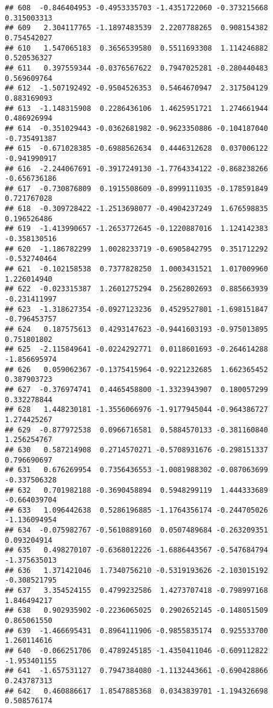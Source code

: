 \documentclass[
]{article}
\begin{document}
\begin{verbatim}
## 608  -0.846404953 -0.4953335703 -1.4351722060 -0.373215668  0.315003313
## 609   2.304117765 -1.1897483539  2.2207788265  0.908154382  0.754542027
## 610   1.547065183  0.3656539580  0.5511693308  1.114246882  0.520536327
## 611   0.397559344 -0.0376567622  0.7947025281 -0.280440483  0.569609764
## 612  -1.507192492 -0.9504526353  0.5464670947  2.317504129  0.883169093
## 613  -1.148315908  0.2286436106  1.4625951721  1.274661944  0.486926994
## 614  -0.351029443 -0.0362681982 -0.9623350886 -0.104187040 -0.735491387
## 615  -0.671028385 -0.6988562634  0.4446312628  0.037006122 -0.941990917
## 616  -2.244067691 -0.3917249130 -1.7764334122 -0.868238266 -0.656736186
## 617  -0.730876809  0.1915508609 -0.8999111035 -0.178591849  0.721767028
## 618  -0.309728422 -1.2513698077 -0.4904237249  1.676598835  0.196526486
## 619  -1.413990657 -1.2653772645 -0.1220887016  1.124142383 -0.358130516
## 620  -1.186782299  1.0028233719 -0.6905842795  0.351712292 -0.532740464
## 621  -0.102158538  0.7377828250  1.0003431521  1.017009960  1.226014940
## 622  -0.023315387  1.2601275294  0.2562802693  0.885663939 -0.231411997
## 623  -1.318627354 -0.0927123236  0.4529527801 -1.698151847 -0.796453757
## 624   0.187575613  0.4293147623 -0.9441603193 -0.975013895  0.751801802
## 625  -2.115849641 -0.0224292771  0.0118601693 -0.264614288 -1.856695974
## 626   0.059062367 -0.1375415964 -0.9221232685  1.662365452  0.387903723
## 627  -0.376974741  0.4465458800 -1.3323943907  0.180057299  0.332278844
## 628   1.448230181 -1.3556066976 -1.9177945044 -0.964386727  1.274425267
## 629  -0.877972538  0.0966716581  0.5884570133 -0.381160840  1.256254767
## 630   0.587214908  0.2714570271 -0.5708931676 -0.298151337  0.796690697
## 631   0.676269954  0.7356436553 -1.0081988302 -0.087063699 -0.337506328
## 632   0.701982188 -0.3690458894  0.5948299119  1.444333689 -0.664039704
## 633   1.096442638  0.5286196885 -1.1764356174 -0.244705026 -1.136094954
## 634  -0.075982767 -0.5610889160  0.0507489684 -0.263209351  0.093204914
## 635   0.498270107 -0.6368012226 -1.6886443567 -0.547684794 -1.375635013
## 636   1.371421046  1.7340756210 -0.5319193626 -2.103015192 -0.308521795
## 637   3.354524155  0.4799232586  1.4273707418 -0.798997168  1.846494217
## 638   0.902935902 -0.2236065025  0.2902652145 -0.148051509  0.865061550
## 639  -1.466695431  0.8964111906 -0.9855835174  0.925533700  1.260114616
## 640  -0.066251706  0.4789245185 -1.4350411046 -0.609112822 -1.953401155
## 641  -1.657531127  0.7947384080 -1.1132443661 -0.690428866  0.243787313
## 642   0.460886617  1.8547885368  0.0343839701 -1.194326698  0.508576174

\end{verbatim}
\end{document}
